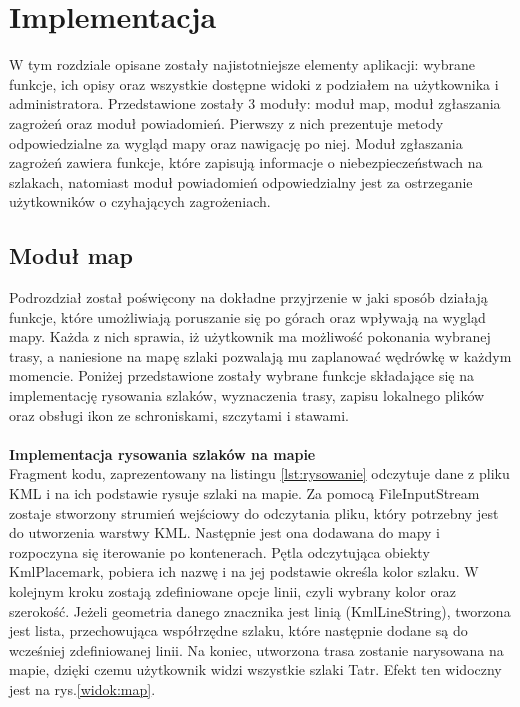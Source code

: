 \section{Implementacja}
W tym rozdziale opisane zostały najistotniejsze elementy aplikacji: wybrane funkcje, ich opisy oraz wszystkie dostępne widoki z podziałem na użytkownika i administratora. 
Przedstawione zostały 3 moduły: moduł map, moduł zgłaszania zagrożeń oraz moduł powiadomień. Pierwszy z nich prezentuje metody odpowiedzialne za wygląd mapy oraz nawigację po niej. Moduł zgłaszania zagrożeń zawiera funkcje, które zapisują informacje o niebezpieczeństwach na szlakach, natomiast moduł powiadomień odpowiedzialny jest za ostrzeganie użytkowników o czyhających zagrożeniach.
\subsection{Moduł map}
Podrozdział został poświęcony na dokładne przyjrzenie w jaki sposób działają funkcje, które umożliwiają poruszanie się po górach oraz wpływają na wygląd mapy. Każda z nich sprawia, iż użytkownik ma możliwość pokonania wybranej trasy, a naniesione na mapę szlaki pozwalają mu zaplanować wędrówkę w każdym momencie. Poniżej przedstawione zostały wybrane funkcje składające się na implementację rysowania szlaków, wyznaczenia trasy, zapisu lokalnego plików oraz obsługi ikon ze schroniskami, szczytami i stawami.
\\ 
\\
\textbf{Implementacja rysowania szlaków na mapie} \\
\indent Fragment kodu, zaprezentowany na listingu \ref{lst:rysowanie} odczytuje dane z pliku KML i na ich podstawie rysuje szlaki na mapie. Za pomocą FileInputStream zostaje stworzony strumień wejściowy do odczytania pliku, który potrzebny jest do utworzenia warstwy KML. Następnie jest ona dodawana do mapy i rozpoczyna się iterowanie po kontenerach. Pętla odczytująca obiekty KmlPlacemark, pobiera ich nazwę i na jej podstawie określa kolor szlaku. W kolejnym kroku zostają zdefiniowane opcje linii, czyli wybrany kolor oraz szerokość. Jeżeli geometria danego znacznika jest linią (KmlLineString), tworzona jest lista, przechowująca współrzędne szlaku, które następnie dodane są do wcześniej zdefiniowanej linii. Na koniec, utworzona trasa zostanie narysowana na mapie, dzięki czemu użytkownik widzi wszystkie szlaki Tatr. Efekt ten widoczny jest na rys.\ref{widok:map}.\\

